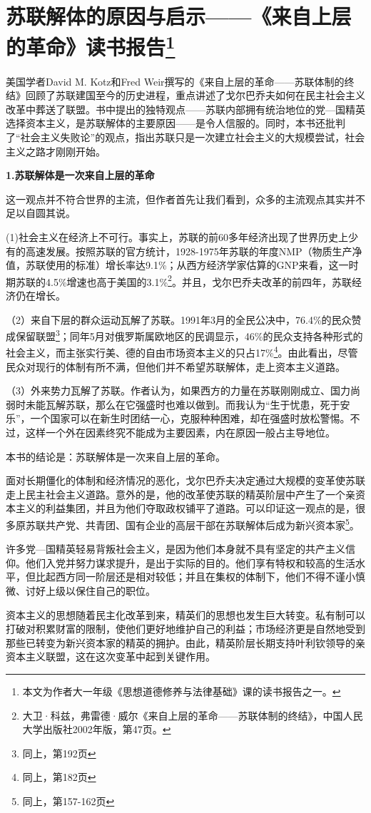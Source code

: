 
\setlength{\parindent}{2em}
\section*{苏联解体的原因与启示——《来自上层的革命》读书报告\footnote{本文为作者大一年级《思想道德修养与法律基础》课的读书报告之一。}}

\par 美国学者David M. Kotz和Fred Weir撰写的《来自上层的革命——苏联体制的终结》回顾了苏联建国至今的历史进程，重点讲述了戈尔巴乔夫如何在民主社会主义改革中葬送了联盟。书中提出的独特观点——苏联内部拥有统治地位的党—国精英选择资本主义，是苏联解体的主要原因——是令人信服的。同时，本书还批判了“社会主义失败论”的观点，指出苏联只是一次建立社会主义的大规模尝试，社会主义之路才刚刚开始。
\par \textbf{1.苏联解体是一次来自上层的革命}
\par 这一观点并不符合世界的主流，但作者首先让我们看到，众多的主流观点其实并不足以自圆其说。
\par (1)社会主义在经济上不可行。事实上，苏联的前60多年经济出现了世界历史上少有的高速发展。按照苏联的官方统计，1928-1975年苏联的年度NMP（物质生产净值，苏联使用的标准）增长率达9.1\%；从西方经济学家估算的GNP来看，这一时期苏联的4.5\%增速也高于美国的3.1\%\footnote{ 大卫·科兹，弗雷德·威尔《来自上层的革命——苏联体制的终结》，中国人民大学出版社2002年版，第47页。}。并且，戈尔巴乔夫改革的前四年，苏联经济仍在增长。
\par （2）来自下层的群众运动瓦解了苏联。1991年3月的全民公决中，76.4\%的民众赞成保留联盟\footnote{同上，第192页}；同年5月对俄罗斯属欧地区的民调显示，46\%的民众支持各种形式的社会主义，而主张实行美、德的自由市场资本主义的只占17\%\footnote{同上，第182页}。由此看出，尽管民众对现行的体制有所不满，但他们并不希望苏联解体，走上资本主义道路。
\par （3）外来势力瓦解了苏联。作者认为，如果西方的力量在苏联刚刚成立、国力尚弱时未能瓦解苏联，那么在它强盛时也难以做到。而我认为“生于忧患，死于安乐”，一个国家可以在新生时团结一心，克服种种困难，却在强盛时放松警惕。不过，这样一个外在因素终究不能成为主要因素，内在原因一般占主导地位。
\par 本书的结论是：苏联解体是一次来自上层的革命。
\par 面对长期僵化的体制和经济情况的恶化，戈尔巴乔夫决定通过大规模的变革使苏联走上民主社会主义道路。意外的是，他的改革使苏联的精英阶层中产生了一个亲资本主义的利益集团，并且为他们夺取政权铺平了道路。可以印证这一观点的是，很多原苏联共产党、共青团、国有企业的高层干部在苏联解体后成为新兴资本家\footnote{同上，第157-162页}。
\par 许多党—国精英轻易背叛社会主义，是因为他们本身就不具有坚定的共产主义信仰。他们入党并努力谋求提升，是出于实际的目的。他们享有特权和较高的生活水平，但比起西方同一阶层还是相对较低；并且在集权的体制下，他们不得不谨小慎微、讨好上级以保住自己的职位。
\par 资本主义的思想随着民主化改革到来，精英们的思想也发生巨大转变。私有制可以打破对积累财富的限制，使他们更好地维护自己的利益；市场经济更是自然地受到那些已转变为新兴资本家的精英的拥护。由此，精英阶层长期支持叶利钦领导的亲资本主义联盟，这在这次变革中起到关键作用。


